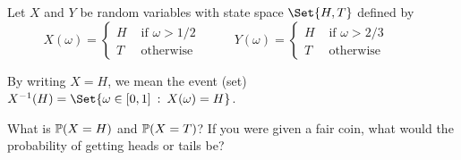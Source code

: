 	\question
		Let $X$ and $Y$ be random variables with state space $\Set{H,T}$ defined by 
		\[
			X(\omega)=\begin{cases}
				H&\text{ if $\omega > 1/2$ }\\
				T&\text{ otherwise}
			\end{cases}\qquad
			Y(\omega)=\begin{cases}
				H&\text{ if $\omega > 2/3$ }\\
				T&\text{ otherwise}
			\end{cases}\qquad
		\]
	\begin{parts}
		\item By writing $X = H$, we mean the event (set) $X^{-1}(H)=\Set{\omega\in[0,1]\given X(\omega)=H}$.

			What is $\P(X=H)$ and $\P(X=T)$? If you were given a fair coin, what would the probability
			of getting heads or tails be?
	\end{parts}


%

